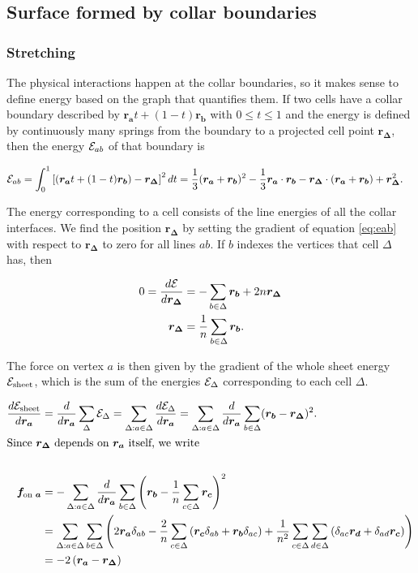 \subsection{Surface formed by collar boundaries}
\subsubsection{Stretching}

The physical interactions happen at the collar boundaries, so it makes sense to define energy based on the graph that quantifies them. If two cells have a collar boundary described by $\bm{r_a} t + (1-t)\bm{r_b}$ with $0 \leq t \leq 1$ and the energy is defined by continuously many springs from the boundary to a projected cell point $\bm{r_\Delta}$, then the energy $\mathcal{E}_{ab}$ of that boundary is 

\begin{align}
    \mathcal{E}_{ab} = \int_0^1 \left[(\bm{r_a}t + (1-t)\bm{r_b}) - \bm{r_\Delta} \right]^2 dt &= \frac{1}{3} (\bm{r_a} + \bm{r_b})^2 - \frac{1}{3} \bm{r_a}\cdot\bm{r_b} - \bm{r_\Delta} \cdot (\bm{r_a} + \bm{r_b}) + \bm{r_\Delta}^2. \label{eq:eab}
\end{align}

The energy corresponding to a cell consists of the line energies of all the collar interfaces. We find the position $\bm{r_\Delta}$ by setting the gradient of equation \ref{eq:eab} with respect to $\bm{r_\Delta}$ to zero for all lines $ab$. If $b$ indexes the vertices that cell $\Delta$ has, then 

\begin{align*}
    0 = \frac{d\mathcal{E}}{d\bm{r_\Delta}} &= -\sum_{b\in\Delta} \bm{r_b} + 2n\bm{r_\Delta} \\
    \bm{r_\Delta} &= \frac{1}{n} \sum_{b\in\Delta} \bm{r_b}.
\end{align*}

The force on vertex $a$ is then given by the gradient of the whole sheet energy $\mathcal{E}_{\text{sheet}}$, which is the sum of the energies $\mathcal{E}_\Delta$ corresponding to each cell $\Delta$. 

\begin{align*}
    \frac{d \mathcal{E}_{\text{sheet}}}{d\bm{r_a}} &= \frac{d}{d\bm{r_a}} \sum_\Delta \mathcal{E}_\Delta = \sum_{\Delta:a \in \Delta} \frac{d\mathcal{E}_\Delta}{d\bm{r_a}} = \sum_{\Delta:a\in\Delta} \frac{d}{d\bm{r_a}} \sum_{b \in \Delta} (\bm{r_b} - \bm{r_\Delta})^2. \\
    \intertext{Since $\bm{r_\Delta}$ depends on $\bm{r_a}$ itself, we write} \\
    \bm{f_{\text{on }a}} &= -\sum_{\Delta:a\in\Delta} \frac{d}{d\bm{r_a}} \sum_{b \in \Delta} \left(\bm{r_b} - \frac{1}{n} \sum_{c\in\Delta} \bm{r_c} \right)^2 \\
    &= \sum_{\Delta:a\in\Delta} \sum_{b \in \Delta} \left(2\bm{r_a}\delta_{ab} - \frac{2}{n} \sum_{c\in\Delta}\left(\bm{r_c}\delta_{ab} + \bm{r_b}\delta_{ac}\right) + \frac{1}{n^2} \sum_{c\in\Delta}\sum_{d\in\Delta} \left(\delta_{ac}\bm{r_d} + \delta_{ad}\bm{r_c} \right) \right) \\
    &= -2\left(\bm{r_a} - \bm{r_\Delta} \right)
\end{align*}

